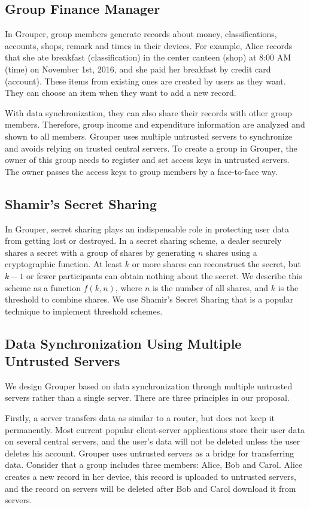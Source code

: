 \documentclass[twocolumn,10pt]{article}
\begin{document}
\subsection{Group Finance Manager}
 In Grouper, group members generate records about money, classifications, accounts, shops, remark and times in their devices. For example, Alice records that she ate breakfast (classification) in the center canteen (shop) at 8:00 AM (time) on November 1st, 2016, and she paid her breakfast by credit card (account). These items from existing ones are created by users as they want. They can choose an item when they want to add a new record.

 With data synchronization, they can also share their records with other group members. Therefore, group income and expenditure information are analyzed and shown to all members. Grouper uses multiple untrusted servers to synchronize and avoids relying on trusted central servers. To create a group in Grouper, the owner of this group needs to register and set access keys in untrusted servers. The owner passes the access keys to group members by a face-to-face way.

\subsection{Shamir's Secret Sharing}
In Grouper, secret sharing plays an indispensable role in protecting user data from getting lost or destroyed. In a secret sharing scheme, a dealer securely shares a secret with a group of shares by generating $n$ shares using a cryptographic function\cite{smith2013layered}. At least $k$ or more shares can reconstruct the secret, but $k-1$ or fewer participants can obtain nothing about the secret\cite{pang2005new}. We describe this scheme as a function $f(k, n)$, where $n$ is the number of all shares, and $k$ is the threshold to combine shares.  We use Shamir's Secret Sharing that  is a popular technique to implement threshold schemes.

\subsection{Data Synchronization Using Multiple Untrusted Servers}

We design Grouper based on data synchronization through multiple untrusted servers rather than a single server. There are three principles in our proposal. 

Firstly, a server transfers data as similar to a router, but does not keep it permanently. Most current popular client-server applications store their user data on several central servers, and the user's data will not be deleted unless the user deletes his account. Grouper uses untrusted servers as a bridge for transferring data. Consider that a group includes three members: Alice, Bob and Carol. Alice creates a new record in her device, this record is uploaded to untrusted servers, and the record on servers will be deleted after Bob and Carol download it from servers.
\end{document}
